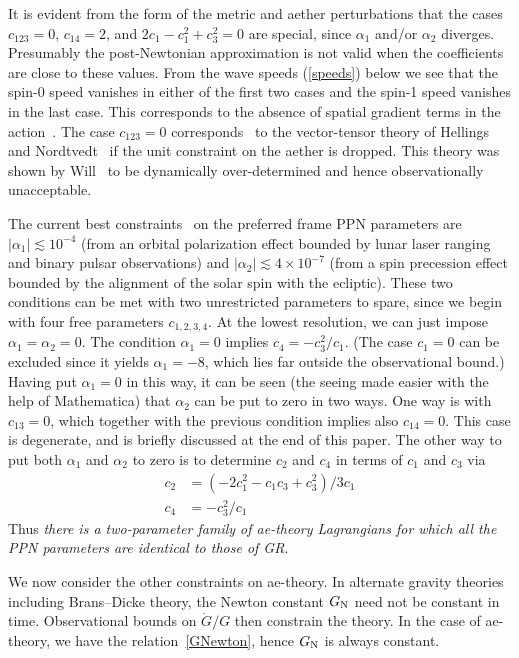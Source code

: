 \documentclass[aps,prd,preprint,amsmath,amssymb]{revtex4}
\def\beq{\begin{equation}}
\def\eeq{\end{equation}}
\def\a{\alpha}
\begin{document}
It is evident from the form of the metric and aether
perturbations that the cases $c_{123}=0$, $c_{14}=2$, and
$2c_1-c_1^2+c_3^2=0$ are special, since $\a_1$ and/or $\a_2$
diverges. Presumably the post-Newtonian approximation is not valid
when the coefficients are close to these values. From the wave
speeds (\ref{speeds}) below we see that the spin-0 speed vanishes
in either of the first two cases and the spin-1 speed vanishes in
the last case. This corresponds to the absence of spatial gradient
terms in the action~\cite{Graesser:2005bg}. The case $c_{123}=0$
corresponds~\cite{ElingJ1} to the vector-tensor theory of Hellings
and Nordtvedt~\cite{HellNord} if the unit constraint on the
aether is dropped.  This theory was shown by
Will~\cite{WillBook} to be dynamically over-determined and hence
observationally unacceptable.

The current best constraints~\cite{WillBook, WillReview} on the
preferred frame PPN parameters are $|\a_1|\lesssim 10^{-4}$ (from an
orbital polarization effect bounded by lunar laser ranging and
binary pulsar observations) and  $|\a_2|\lesssim 4\times10^{-7}$
(from a spin precession effect bounded by the alignment of the
solar spin with the ecliptic). These two conditions can be met with
two unrestricted parameters to spare, since we begin with
four free parameters $c_{1,2,3,4}$. At the lowest resolution,
we can just impose $\a_1=\a_2=0$.
The condition $\a_1=0$ implies
$c_4=-c_3^2/c_1$. (The case $c_1=0$
can be excluded since it yields $\a_1=-8$, which lies far outside the
observational bound.) Having put $\a_1=0$ in this way, it can
be seen (the seeing made easier with the help of Mathematica)
that $\a_2$ can be put to zero in two ways. One way is with
$c_{13}=0$, which together with the previous condition implies
also $c_{14}=0$.
This case is degenerate, and is
briefly discussed at the end of this paper.
The other way to put both $\a_1$ and $\a_2$ to zero is to determine
$c_2$ and $c_4$ in terms of $c_1$ and $c_3$ via
%
\beq\label{zeroalphas}
\begin{split}
    c_2&=(-2c_1^2-c_1c_3 + c_3^2)/3c_1\\
    c_4&=-c_3^2/c_1
\end{split}
\eeq
%
Thus {\it there is a two-parameter family of ae-theory Lagrangians
for which all the PPN parameters are identical to those of GR}.

We now consider the other constraints on ae-theory. In alternate
gravity theories including Brans--Dicke theory, the Newton
constant $G_{\rm N}$ need not be constant in time. Observational
bounds on $\dot{G}/G$ then constrain the theory. In the case of
ae-theory, we have the relation~\eqref{GNewton}, hence $G_{\rm
N}$ is always constant.
\end{document}
